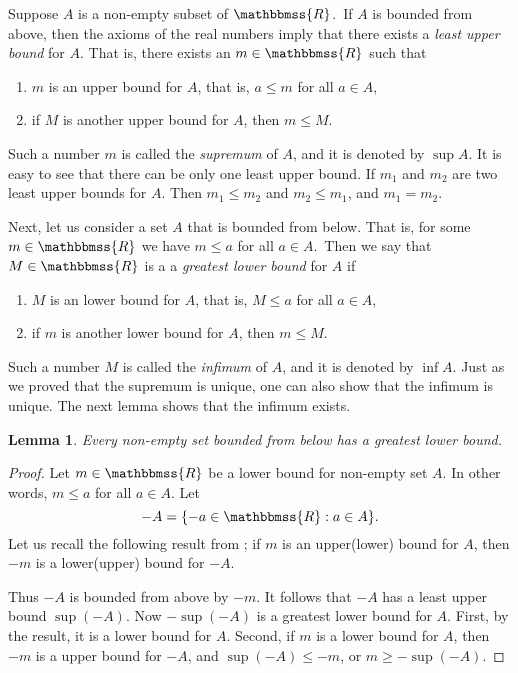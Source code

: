 \documentclass[12pt]{article}
\newcommand{\R}{\mathbbmss{R}}
\newtheorem{lemma}{Lemma}
\begin{document}
Suppose $A$ is a non-empty subset of $\R$.\, If $A$ is bounded from above, then 
the axioms of the real numbers imply that there exists
a \emph{least upper bound} for  $A$. 
That is, there exists an $m\in \R$ such that
\begin{enumerate}
\item $m$ is an upper bound for $A$, that is, $a\le m$ for all $a\in A$, 
\item if $M$ is another upper bound for $A$, then $m\le M$.
\end{enumerate}
Such a number $m$ is called the \emph{supremum} of $A$,
and it is denoted by $\sup A$. It is easy to see that
there can be only one least upper bound. If $m_1$ and $m_2$ are 
two least upper bounds for $A$. Then $m_1\le m_2$ and $m_2\le m_1$, 
and $m_1=m_2$.

Next, let us consider a set $A$ that is bounded from below. That is, for
some $m\in \R$ we have $m\le a$ for all $a\in A$.\, Then we say that 
$M\in \R$ is a 
a \emph{greatest lower bound} for $A$ if
\begin{enumerate}
\item $M$ is an lower bound for $A$, that is, $M \le a$ for all $a\in A$, 
\item if $m$ is another lower bound for $A$, then $m\le M$.
\end{enumerate}
Such a number $M$ is called the \emph{infimum} of $A$,
and it is denoted by $\inf A$. Just as we proved that the supremum
is unique, one can also show that the infimum is unique. 
The next lemma shows that the infimum exists.

\begin{lemma} Every non-empty set bounded from below has a greatest lower bound. 
\end{lemma}

\begin{proof} Let $m\in \R$ be a lower bound for non-empty set $A$. 
In other words, $m\le a$ for all $a\in A$. Let
$$  
   -A = \{ -a \in \R : a\in A\}.
$$
Let us recall the following result from ;
if $m$ is an upper(lower) bound for $A$, then $-m$ is a lower(upper)
bound for $-A$. 

Thus $-A$ is bounded from above by $-m$. 
It follows that $-A$ has a  least upper bound $\sup (-A)$. 
Now $-\sup (-A)$ is a greatest lower bound for $A$. 
First, by the result, it is a lower bound for $A$. 
Second, if $m$ is a lower bound for $A$,
then $-m$ is a upper bound for $-A$, and 
$\sup (-A)\le -m$, or $m\ge -\sup (-A)$.
\end{proof}
\end{document}

